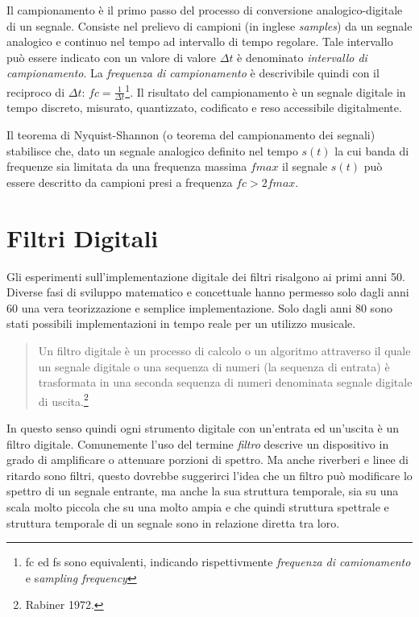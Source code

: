 Il campionamento è il primo passo del processo di conversione analogico-digitale
di un segnale. Consiste nel prelievo di campioni (in inglese \emph{samples}) da
un segnale analogico e continuo nel tempo ad intervallo di tempo regolare.
Tale intervallo può essere indicato con un valore di valore $\Delta t$ è denominato
\emph{intervallo di campionamento}. La \emph{frequenza di campionamento} è
descrivibile quindi con il reciproco di
$ \Delta t $: $ fc = \frac{1}{\Delta t} $\footnote{fc ed fs sono equivalenti,
indicando rispettivmente \emph{frequenza di camionamento} e s\emph{ampling frequency}}.
Il risultato del campionamento è un segnale digitale in tempo discreto,
misurato, quantizzato, codificato e reso accessibile digitalmente.

Il teorema di Nyquist-Shannon (o teorema del campionamento dei segnali) stabilisce
che, dato un segnale analogico definito nel tempo $s(t)$ la cui banda di frequenze
sia limitata da una frequenza massima $fmax$ il segnale $s(t)$ può essere descritto
da campioni presi a frequenza $fc > 2fmax$.

\clearpage

\section{Filtri Digitali}

Gli esperimenti sull'implementazione digitale dei filtri risalgono ai primi anni 50.
Diverse fasi di sviluppo matematico e concettuale hanno permesso solo dagli anni 60
una vera teorizzazione e semplice implementazione. Solo dagli anni 80 sono stati
possibili implementazioni in tempo reale per un utilizzo musicale.

\begin{quote}
  Un filtro digitale è un processo di calcolo o un algoritmo attraverso il quale
  un segnale digitale o una sequenza di numeri (la sequenza di entrata) è
  trasformata in una seconda sequenza di numeri denominata segnale digitale di
  uscita.\footnote{Rabiner 1972.}
\end{quote}

In questo senso quindi ogni strumento digitale con un'entrata ed un'uscita è un
filtro digitale. Comunemente l'uso del termine \emph{filtro} descrive un dispositivo
in grado di amplificare o attenuare porzioni di spettro. Ma anche riverberi e linee
di ritardo sono filtri, questo dovrebbe suggerirci l'idea che un filtro può
modificare lo spettro di un segnale entrante, ma anche la sua struttura temporale,
sia su una scala molto piccola che su una molto ampia e che quindi struttura
spettrale e struttura temporale di un segnale sono in relazione diretta tra loro.

